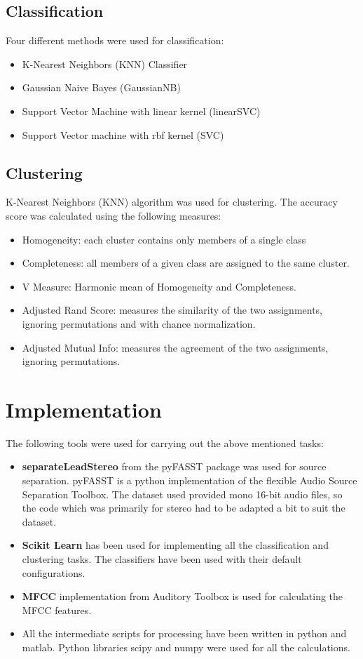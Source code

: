 \documentclass[12pt,journal,compsoc]{IEEEtran}
\begin{document}
\subsection{Classification}
\label{classification}
Four different methods were used for classification:
\begin{itemize}
\item K-Nearest Neighbors (KNN) Classifier
\item Gaussian Naive Bayes (GaussianNB)
\item Support Vector Machine with linear kernel (linearSVC)
\item Support Vector machine with rbf kernel (SVC)
\end{itemize}

\subsection{Clustering}
\label{clustering}
K-Nearest Neighbors (KNN) algorithm was used for clustering. The accuracy score was calculated using the following measures:
\begin{itemize}
\item Homogeneity: each cluster contains only members of a single class \cite{cluster}
\item Completeness: all members of a given class are assigned to the same cluster.
\item V Measure: Harmonic mean of Homogeneity and Completeness.
\item Adjusted Rand Score: measures the similarity of the two assignments, ignoring permutations and with chance normalization.
\item Adjusted Mutual Info: measures the agreement of the two assignments, ignoring permutations.
\end{itemize}


\section{Implementation}
The following tools were used for carrying out the above mentioned tasks:
\begin{itemize}
\item \textbf{separateLeadStereo} from the pyFASST package \cite{durrieu03} was used for source separation. pyFASST is a python implementation of the flexible Audio Source Separation Toolbox. The dataset used provided mono 16-bit audio files, so the code which was primarily for stereo had to be adapted a bit to suit the dataset.
\item \textbf{Scikit Learn} has been used for implementing all the classification and clustering tasks. The classifiers have been used with their default configurations.
\item \textbf{MFCC} implementation from Auditory Toolbox \cite{auditoryToolbox}  is used for calculating the MFCC features.
\item All the intermediate scripts for processing have been written in python and matlab. Python libraries scipy and numpy were used for all the calculations.
\end{itemize}
\end{document}

